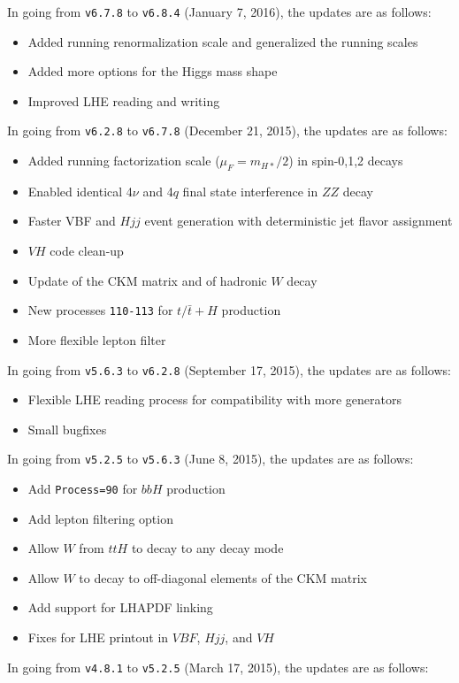\documentclass[aps,superscriptaddress,nofootinbib]{revtex4}
\begin{document}
\noindent
In going from \verb|v6.7.8| to \verb|v6.8.4| (January 7, 2016), the updates are as follows:
\begin{itemize}
\item Added running renormalization scale and generalized the running scales
\item Added more options for the Higgs mass shape
\item Improved LHE reading and writing
\end{itemize}
\noindent
In going from \verb|v6.2.8| to \verb|v6.7.8| (December 21, 2015), the updates are as follows:
\begin{itemize}
\item Added running factorization scale ($\mu_F=m_{H*}/2$) in spin-0,1,2 decays
\item Enabled identical 4$\nu$ and 4$q$ final state interference in $ZZ$ decay
\item Faster VBF and $Hjj$ event generation with deterministic jet flavor assignment
\item $VH$ code clean-up
\item Update of the CKM matrix and of hadronic $W$ decay
\item New processes \verb|110-113| for $t/\bar{t}+H$ production
\item More flexible lepton filter
\end{itemize}
\noindent
In going from \verb|v5.6.3| to \verb|v6.2.8| (September 17, 2015), the updates are as follows:
\begin{itemize}
\item Flexible LHE reading process for compatibility with more generators
\item Small bugfixes
\end{itemize}
\noindent
In going from \verb|v5.2.5| to \verb|v5.6.3| (June 8, 2015), the updates are as follows:
\begin{itemize}
\item Add \verb|Process=90| for $bbH$ production
\item Add lepton filtering option
\item Allow $W$ from $ttH$ to decay to any decay mode
\item Allow $W$ to decay to off-diagonal elements of the CKM matrix
\item Add support for LHAPDF linking
\item Fixes for LHE printout in $VBF$, $Hjj$, and $VH$
\end{itemize}
\noindent
In going from \verb|v4.8.1| to \verb|v5.2.5| (March 17, 2015), the updates are as follows:
\end{document}
